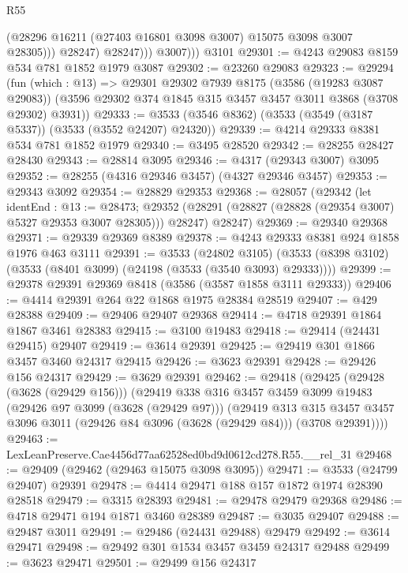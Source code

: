 \begin{lexlean}{R55}
\begin{coremodule}
                    (@28296 @16211 (@27403 @16801 @3098 @3007) @15075 @3098 @3007 @28305)))
                @28247)
              @28247)))
          @3007)))
    @3101
@29301 := @4243 @29083 @8159 @534 @781 @1852 @1979 @3087
@29302 := @23260 @29083
@29323 := @29294
    (fun (which : @13) =>
    @29301
      @29302
      @7939
      @8175
      (@3586 (@19283 @3087 @29083))
      (@3596 @29302 @374 @1845 @315 @3457 @3457 @3011 @3868 (@3708 @29302) @3931))
@29333 := @3533 (@3546 @8362) (@3533 (@3549 (@3187 @5337)) (@3533 (@3552 @24207) @24320))
@29339 := @4214 @29333 @8381 @534 @781 @1852 @1979
@29340 := @3495 @28520
@29342 := @28255 @28427 @28430
@29343 := @28814 @3095
@29346 := @4317 (@29343 @3007) @3095
@29352 := @28255 (@4316 @29346 @3457) (@4327 @29346 @3457)
@29353 := @29343 @3092
@29354 := @28829 @29353
@29368 := @28057
    (@29342
      (let identEnd : @13 := @28473;
      @29352 (@28291 (@28827 (@28828 (@29354 @3007) @5327 @29353 @3007 @28305))) @28247)
      @28247)
@29369 := @29340 @29368
@29371 := @29339 @29369 @8389
@29378 := @4243 @29333 @8381 @924 @1858 @1976 @463 @3111
@29391 := @3533
    (@24802 @3105)
    (@3533 (@8398 @3102) (@3533 (@8401 @3099) (@24198 (@3533 (@3540 @3093) @29333))))
@29399 := @29378 @29391 @29369 @8418 (@3586 (@3587 @1858 @3111 @29333))
@29406 := @4414 @29391 @264 @22 @1868 @1975 @28384 @28519
@29407 := @429 @28388
@29409 := @29406 @29407 @29368
@29414 := @4718 @29391 @1864 @1867 @3461 @28383
@29415 := @3100 @19483
@29418 := @29414 (@24431 @29415) @29407
@29419 := @3614 @29391
@29425 := @29419 @301 @1866 @3457 @3460 @24317 @29415
@29426 := @3623 @29391
@29428 := @29426 @156 @24317
@29429 := @3629 @29391
@29462 := @29418
    (@29425
      (@29428 (@3628 (@29429 @156)))
      (@29419
        @338
        @316
        @3457
        @3459
        @3099
        @19483
        (@29426 @97 @3099 (@3628 (@29429 @97)))
        (@29419
          @313
          @315
          @3457
          @3457
          @3096
          @3011
          (@29426 @84 @3096 (@3628 (@29429 @84)))
          (@3708 @29391))))
@29463 := LexLeanPreserve.Cae4456d77aa62528ed0bd9d0612cd278.R55.__rel_31
@29468 := @29409 (@29462 (@29463 @15075 @3098 @3095))
@29471 := @3533 (@24799 @29407) @29391
@29478 := @4414 @29471 @188 @157 @1872 @1974 @28390 @28518
@29479 := @3315 @28393
@29481 := @29478 @29479 @29368
@29486 := @4718 @29471 @194 @1871 @3460 @28389
@29487 := @3035 @29407
@29488 := @29487 @3011
@29491 := @29486 (@24431 @29488) @29479
@29492 := @3614 @29471
@29498 := @29492 @301 @1534 @3457 @3459 @24317 @29488
@29499 := @3623 @29471
@29501 := @29499 @156 @24317

\end{coremodule}
\end{lexlean}
